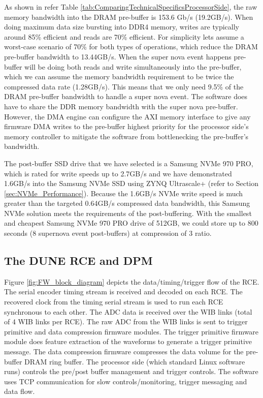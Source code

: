 As shown in refer Table \ref{tab:ComparingTechnicalSpecificsProcessorSide}, the raw memory bandwidth into the DRAM pre-buffer is 153.6 Gb/s (19.2GB/s).  When doing maximum data size bursting into DDR4 memory, writes are typically around 85\% efficient and reads are 70\% efficient.  For simplicity lets assume a worst-case scenario of 70\% for both types of operations, which reduce the DRAM pre-buffer bandwidth to 13.44GB/s.  When the super nova event happens pre-buffer will be doing both reads and write simultaneously into the pre-buffer, which we can assume the memory bandwidth requirement to be twice the compressed data rate (1.28GB/s). This means that we only need 9.5\% of the DRAM pre-buffer bandwidth to handle a super nova event. The software does have to share the DDR memory bandwidth with the super nova pre-buffer.  However, the DMA engine can configure the AXI memory interface to give any firmware DMA writes to the pre-buffer highest priority for the processor side's memory controller to mitigate the software from bottlenecking the pre-buffer's bandwidth.

The post-buffer SSD drive that we have selected is a Samsung NVMe 970 PRO, which is rated for write speeds up to 2.7GB/s and we have demonstrated 1.6GB/s into the Samsung NVMe SSD using ZYNQ Ultrascale+ (refer to Section \ref{sec:NVMe_Performance}).  Because the 1.6GB/s NVMe write speed is much greater than the targeted 0.64GB/s compressed data bandwidth, this Samsung NVMe solution meets the requirements of the post-buffering. With the smallest and cheapest Samsung NVMe 970 PRO drive of 512GB, we could store up to 800 seconds (8 supernova event post-buffers) at compression of 3 ratio. 

\subsection{The DUNE RCE and DPM}

Figure \ref{fig:FW_block_diagram} depicts the data/timing/trigger flow of the RCE. The serial encoder timing stream is received and decoded on each RCE.  The recovered clock from the timing serial stream is used to run each RCE synchronous to each other. The ADC data is received over the WIB links (total of 4 WIB links per RCE). The raw ADC from the WIB links is sent to trigger primitive and data compression firmware modules. The trigger primitive firmware module does feature extraction of the waveforms to generate a trigger primitive message.  The data compression firmware compresses the data volume for the pre-buffer DRAM ring buffer. The processor side (which standard Linux software runs) controls the pre/post buffer management and trigger controls.  The software uses TCP communication for slow controls/monitoring, trigger messaging and data flow. 

